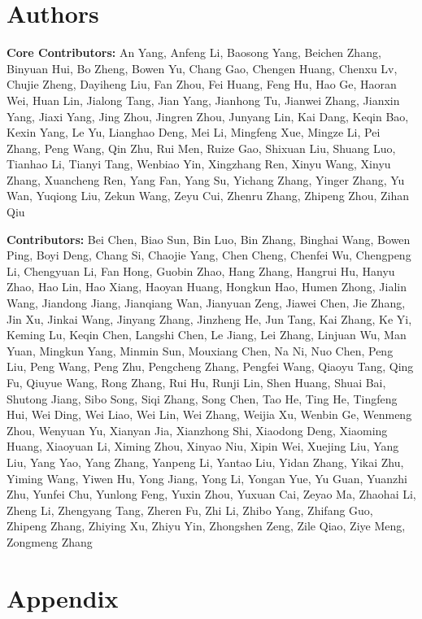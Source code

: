 \documentclass[dvipsnames]{article}
\begin{document}
\section{Authors}

\textbf{Core Contributors:} An Yang, Anfeng Li, Baosong Yang, Beichen Zhang, Binyuan Hui, Bo Zheng, Bowen Yu, Chang Gao, Chengen Huang, Chenxu Lv, Chujie Zheng, Dayiheng Liu, Fan Zhou, Fei Huang, Feng Hu, Hao Ge, Haoran Wei, Huan Lin, Jialong Tang, Jian Yang, Jianhong Tu, Jianwei Zhang, Jianxin Yang, Jiaxi Yang, Jing Zhou, Jingren Zhou, Junyang Lin, Kai Dang, Keqin Bao, Kexin Yang, Le Yu, Lianghao Deng, Mei Li, Mingfeng Xue, Mingze Li, Pei Zhang, Peng Wang, Qin Zhu, Rui Men, Ruize Gao, Shixuan Liu, Shuang Luo, Tianhao Li, Tianyi Tang, Wenbiao Yin, Xingzhang Ren, Xinyu Wang, Xinyu Zhang, Xuancheng Ren, Yang Fan, Yang Su, Yichang Zhang, Yinger Zhang, Yu Wan, Yuqiong Liu, Zekun Wang, Zeyu Cui, Zhenru Zhang, Zhipeng Zhou, Zihan Qiu

\textbf{Contributors:} Bei Chen, Biao Sun, Bin Luo, Bin Zhang, Binghai Wang, Bowen Ping, Boyi Deng, Chang Si, Chaojie Yang, Chen Cheng, Chenfei Wu, Chengpeng Li, Chengyuan Li, Fan Hong, Guobin Zhao, Hang Zhang, Hangrui Hu, Hanyu Zhao, Hao Lin, Hao Xiang, Haoyan Huang, Hongkun Hao, Humen Zhong, Jialin Wang, Jiandong Jiang, Jianqiang Wan, Jianyuan Zeng, Jiawei Chen, Jie Zhang, Jin Xu, Jinkai Wang, Jinyang Zhang, Jinzheng He, Jun Tang, Kai Zhang, Ke Yi, Keming Lu, Keqin Chen, Langshi Chen, Le Jiang, Lei Zhang, Linjuan Wu, Man Yuan, Mingkun Yang, Minmin Sun, Mouxiang Chen, Na Ni, Nuo Chen, Peng Liu, Peng Wang, Peng Zhu, Pengcheng Zhang, Pengfei Wang, Qiaoyu Tang, Qing Fu, Qiuyue Wang, Rong Zhang, Rui Hu, Runji Lin, Shen Huang, Shuai Bai, Shutong Jiang, Sibo Song, Siqi Zhang, Song Chen, Tao He, Ting He, Tingfeng Hui, Wei Ding, Wei Liao, Wei Lin, Wei Zhang, Weijia Xu, Wenbin Ge, Wenmeng Zhou, Wenyuan Yu, Xianyan Jia, Xianzhong Shi, Xiaodong Deng, Xiaoming Huang, Xiaoyuan Li, Ximing Zhou, Xinyao Niu, Xipin Wei, Xuejing Liu, Yang Liu, Yang Yao, Yang Zhang, Yanpeng Li, Yantao Liu, Yidan Zhang, Yikai Zhu, Yiming Wang, Yiwen Hu, Yong Jiang, Yong Li, Yongan Yue, Yu Guan, Yuanzhi Zhu, Yunfei Chu, Yunlong Feng, Yuxin Zhou, Yuxuan Cai, Zeyao Ma, Zhaohai Li, Zheng Li, Zhengyang Tang, Zheren Fu, Zhi Li, Zhibo Yang, Zhifang Guo, Zhipeng Zhang, Zhiying Xu, Zhiyu Yin, Zhongshen Zeng, Zile Qiao, Ziye Meng, Zongmeng Zhang

\clearpage
\appendix

\section{Appendix}
\label{sec:appendix}
\end{document}
